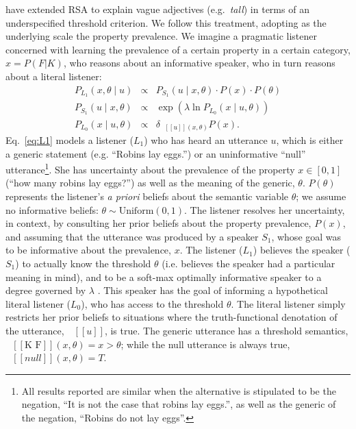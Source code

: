 \documentclass[10pt,letterpaper]{article}
\newcommand{\denote}[1]{\mbox{ $[\![ #1 ]\!]$}}
\begin{document}
%
 have extended RSA to explain vague adjectives (e.g.~\emph{tall}) in terms of an underspecified threshold criterion. 
We follow this treatment, adopting as the underlying scale the property prevalence.
We imagine a pragmatic listener concerned with learning the prevalence of a certain property in a certain category, $x=P(F|K)$, who reasons about an informative speaker, who in turn reasons about a literal listener:
\begin{eqnarray}
P_{L_{1}}(x , \theta \mid u) &\propto& P_{S_{1}}(u \mid x, \theta) \cdot P(x) \cdot P(\theta) \label{eq:L1}\\
P_{S_{1}}(u \mid x, \theta) &\propto& \exp(\lambda \ln {P_{L_{0}}(x \mid u, \theta)}) \label{eq:S1}\\
P_{L_{0}}(x \mid u, \theta) &\propto& {\delta_{\denote{u}(x, \theta)} P(x)}. \label{eq:L0}
\end{eqnarray}
Eq.~\ref{eq:L1} models a listener ($L_{1}$) who has heard an utterance $u$, which is either a generic statement (e.g. ``Robins lay eggs.'') or an uninformative ``null'' utterance\footnote{All results reported are similar when the alternative is stipulated to be the negation,  ``It is not the case that robins lay eggs.'', as well as the generic of the negation, ``Robins do not lay eggs''.}.%
She has uncertainty about the prevalence of the property $x \in [0, 1]$ (``how many robins lay eggs?'') as well as the meaning of the generic, $\theta$. 
$P(\theta)$ represents the listener's \emph{a priori} beliefs about the semantic variable $\theta$; we assume no informative beliefs: $\theta \sim \text{Uniform}(0,1)$.
The listener resolves her uncertainty, in context, by consulting her prior beliefs about the property prevalence, $P(x)$, and assuming that the utterance was produced by a speaker $S_{1}$, whose goal was to be informative about the prevalence, $x$.
The listener ($L_{1}$) believes the speaker ($S_{1}$) to actually know the threshold $\theta$ (i.e. believes the speaker had a particular meaning in mind), and to be a soft-max optimally informative speaker to a degree governed by $\lambda$ \cite{Luce1959}. 
This speaker has the goal of informing a hypothetical literal listener ($L_0$), who has access to the threshold $\theta$. 
The literal listener simply restricts her prior beliefs to situations where the truth-functional denotation of the utterance, $\denote{u}$, is true.
The generic utterance has a threshold semantics, $\denote{\text{K F}}(x, \theta)=x>\theta$; while the null utterance is always true, $\denote{null}(x, \theta)=T$.
\end{document}
